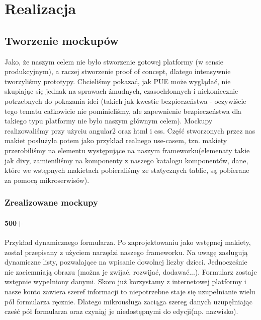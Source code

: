 \documentclass[licencjacka]{pracamgr}
\begin{document}
\chapter{Realizacja}

\section{Tworzenie mockupów}
Jako, że naszym celem nie było stworzenie gotowej platformy (w sensie produkcyjnym), a raczej stworzenie proof of concept,
dlatego intensywnie tworzyliśmy prototypy. Chcieliśmy pokazać, jak PUE może wyglądać, nie skupiając się jednak na
sprawach żmudnych, czasochłonnych i niekoniecznie potrzebnych do pokazania idei (takich jak kwestie bezpieczeństwa - oczywiście
tego tematu całkowicie nie pominieliśmy, ale zapewnienie bezpieczeństwa dla takiego typu platformy nie było naszym głównym celem).
Mockupy realizowaliśmy przy użyciu angular2 oraz html i css. Część stworzonych przez nas makiet posłużyła potem jako przykład
realnego use-casem, tzn. makiety przerobiliśmy na elementu występujące na naszym frameworku(elemenaty takie jak divy, zamieniliśmy na
komponenty z naszego katalogu komponentów, dane, które we wstępnych makietach pobieraliśmy ze statycznych tablic, są pobierane za
pomocą mikroserwisów). 

\subsection{Zrealizowane mockupy}
\subsubsection{500+}
Przykład dynamicznego formularza. Po zaprojektowaniu jako wstępnej makiety, został przepisany
z użyciem narzędzi naszego frameworku. Na uwagę zasługują dynamiczne listy, pozwalające
na wpisanie dowolnej liczby dzieci. Jednocześnie nie zaciemniają obrazu (można je zwijać, rozwijać, dodawać...).
Formularz zostaje wstępnie wypełniony danymi. Skoro już korzystamy z internetowej platformy i nasze konto
zawiera szeref informacji to niepotrzebne staje się uzupełnianie wielu pół formularza ręcznie. Dlatego
mikrousługa zaciąga szereg danych uzupęłniając cześć pół formularza oraz czyniąj je niedostępnymi do edycji(np. nazwisko).
\end{document}

